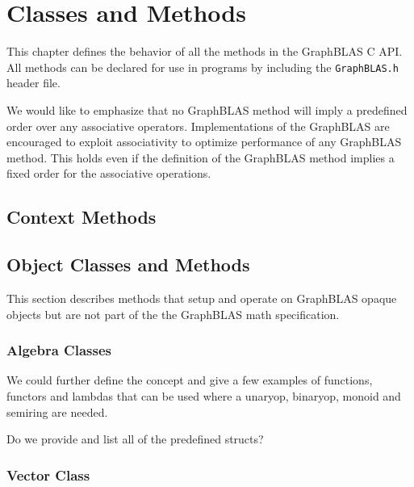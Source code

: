 \chapter{Classes and Methods}
\label{Chp:Methods}

This chapter defines the behavior of all the methods in the GraphBLAS C API.
All methods can be declared for use in programs by including the {\tt GraphBLAS.h} header file.

We would like to emphasize that no GraphBLAS method will imply a predefined order over any associative operators. Implementations of the GraphBLAS are encouraged to exploit associativity to optimize performance of any GraphBLAS method. This holds even if the definition of the GraphBLAS method implies a fixed order for the associative operations.

\section{Context Methods}

\section{Object Classes and Methods}

This section describes methods that setup and operate on GraphBLAS opaque objects
but are not part of the the GraphBLAS math specification.  

\subsection{Algebra Classes}


We could further define the concept and give a few examples of functions, functors and lambdas  that can be used where a unaryop, binaryop, monoid and semiring are needed.

Do we provide and list all of the predefined structs?


\subsection{Vector Class}

